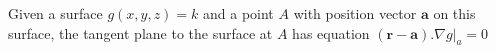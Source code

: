 Given a surface $g(x,y,z)=k$ and a point $A$ with position vector
$\mathbf{a}$ on this surface, the tangent plane to the surface at $A$
has equation $ (\mathbf{r}-\mathbf{a}) . \left. \nabla g \right | _a = 0 $